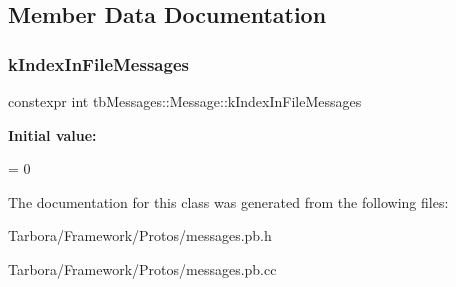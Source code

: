\subsection{Member Data Documentation}
\mbox{\label{classtbMessages_1_1Message_a80f84611728b925025bf80c0e4737ca3}} 
\subsubsection{\texorpdfstring{k\+Index\+In\+File\+Messages}{kIndexInFileMessages}}
{\footnotesize\ttfamily constexpr int tb\+Messages\+::\+Message\+::k\+Index\+In\+File\+Messages\hspace{0.3cm}{\ttfamily [static]}}

{\bfseries Initial value\+:}
\begin{DoxyCode}
=
    0
\end{DoxyCode}


The documentation for this class was generated from the following files\+:\begin{DoxyCompactItemize}
\item 
Tarbora/\+Framework/\+Protos/messages.\+pb.\+h\item 
Tarbora/\+Framework/\+Protos/messages.\+pb.\+cc\end{DoxyCompactItemize}
